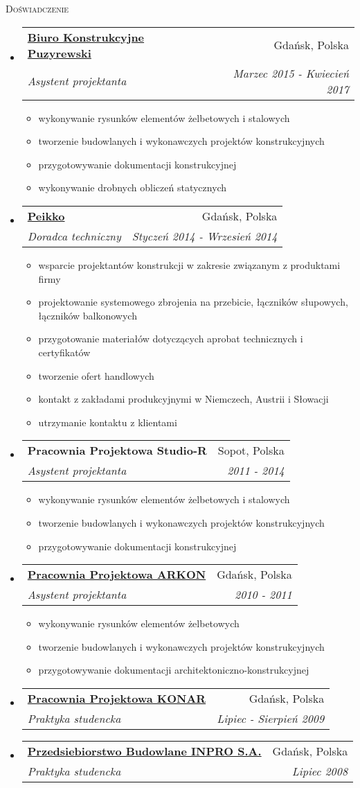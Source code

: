 \documentclass[letterpaper,11pt]{article}
\makeatletter
\newcommand{\resheading}[1]{
  \begin{tcolorbox}
  \textsc{#1}
  \end{tcolorbox}
}
\newcommand{\resitem}[1]{\item #1 \vspace{-2pt}}
\newcommand{\ressubheading}[4]{
\begin{tabular*}{6.5in}{l@{\extracolsep{\fill}}r}
		\textbf{#1} & #2 \\
		\textit{#3} & \textit{#4} \\
\end{tabular*}\vspace{-6pt}}
\makeatother
\begin{document}
\resheading{Doświadczenie}
\begin{itemize}

\item
  \ressubheading{\href{www.puzyrewski.pl}{Biuro Konstrukcyjne Puzyrewski}}{Gdańsk, Polska}{Asystent projektanta}{Marzec 2015 - Kwiecień 2017}
  \begin{itemize}
    \resitem{wykonywanie rysunków elementów żelbetowych i stalowych}
    \resitem{tworzenie budowlanych i wykonawczych projektów konstrukcyjnych}
    \resitem{przygotowywanie dokumentacji konstrukcyjnej}
    \resitem{wykonywanie drobnych obliczeń statycznych}
  \end{itemize}

\item
  \ressubheading{\href{www.peikko.pl}{Peikko}}{Gdańsk, Polska}{Doradca techniczny}{Styczeń 2014 - Wrzesień 2014}
  \begin{itemize}
    \resitem{wsparcie projektantów konstrukcji w zakresie związanym z produktami firmy}
    \resitem{projektowanie systemowego zbrojenia na przebicie, łączników słupowych, łączników balkonowych}
    \resitem{przygotowanie materiałów dotyczących aprobat technicznych i certyfikatów}
    \resitem{tworzenie ofert handlowych}
    \resitem{kontakt z zakładami produkcyjnymi w Niemczech, Austrii i Słowacji}
    \resitem{utrzymanie kontaktu z klientami}
  \end{itemize}

\item 
  \ressubheading{Pracownia Projektowa Studio-R}{Sopot, Polska}{Asystent projektanta}{2011 - 2014}
  \begin{itemize}
    \resitem{wykonywanie rysunków elementów żelbetowych i stalowych}
    \resitem{tworzenie budowlanych i wykonawczych projektów konstrukcyjnych}
    \resitem{przygotowywanie dokumentacji konstrukcyjnej}
  \end{itemize}
  
\item
  \ressubheading{\href{http://www.konar.eu/}{Pracownia Projektowa ARKON}}{Gdańsk, Polska}{Asystent projektanta}{2010 - 2011}
  \begin{itemize}
    \resitem{wykonywanie rysunków elementów żelbetowych}
    \resitem{tworzenie budowlanych i wykonawczych projektów konstrukcyjnych}
    \resitem{przygotowywanie dokumentacji architektoniczno-konstrukcyjnej}
  \end{itemize}
  
\item
  \ressubheading{\href{http://www.konar.eu/}{Pracownia Projektowa KONAR}}{Gdańsk, Polska}{Praktyka studencka}{Lipiec - Sierpień 2009}

\item
  \ressubheading{\href{https://www.inpro.com.pl}{Przedsiebiorstwo Budowlane INPRO S.A.}}{Gdańsk, Polska}{Praktyka studencka}{Lipiec 2008}

\end{itemize}
\end{document}
